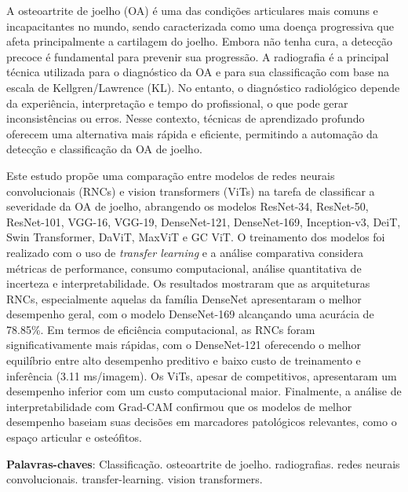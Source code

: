 
\setlength{\absparsep}{18pt} %
\begin{resumo}
A osteoartrite de joelho (OA) é uma das condições articulares mais comuns e incapacitantes no mundo, sendo caracterizada como uma doença progressiva que afeta principalmente a cartilagem do joelho. Embora não tenha cura, a detecção precoce é fundamental para prevenir sua progressão. A radiografia é a principal técnica utilizada para o diagnóstico da OA e para sua classificação com base na escala de Kellgren/Lawrence (KL). No entanto, o diagnóstico radiológico depende da experiência, interpretação e tempo do profissional, o que pode gerar inconsistências ou erros. Nesse contexto, técnicas de aprendizado profundo oferecem uma alternativa mais rápida e eficiente, permitindo a automação da detecção e classificação da OA de joelho.

Este estudo propõe uma comparação entre modelos de redes neurais convolucionais (RNCs) e vision transformers (ViTs) na tarefa de classificar a severidade da OA de joelho, abrangendo os modelos ResNet-34, ResNet-50, ResNet-101, VGG-16, VGG-19, DenseNet-121, DenseNet-169, Inception-v3, DeiT, Swin Transformer, DaViT, MaxViT e GC ViT. O treinamento dos modelos foi realizado com o uso de \textit{transfer learning} e a análise comparativa considera métricas de performance, consumo computacional, análise quantitativa de incerteza e interpretabilidade. Os resultados mostraram que as arquiteturas RNCs, especialmente aquelas da família DenseNet apresentaram o melhor desempenho geral, com o modelo DenseNet-169 alcançando uma acurácia de 78.85\%. Em termos de eficiência computacional, as RNCs foram significativamente mais rápidas, com o DenseNet-121 oferecendo o melhor equilíbrio entre alto desempenho preditivo e baixo custo de treinamento e inferência (3.11 ms/imagem). Os ViTs, apesar de competitivos, apresentaram um desempenho inferior com um custo computacional maior. Finalmente, a análise de interpretabilidade com Grad-CAM confirmou que os modelos de melhor desempenho baseiam suas decisões em marcadores patológicos relevantes, como o espaço articular e osteófitos.

 \textbf{Palavras-chaves}: Classificação. osteoartrite de joelho. radiografias. redes neurais convolucionais. transfer-learning. vision transformers.
\end{resumo}

